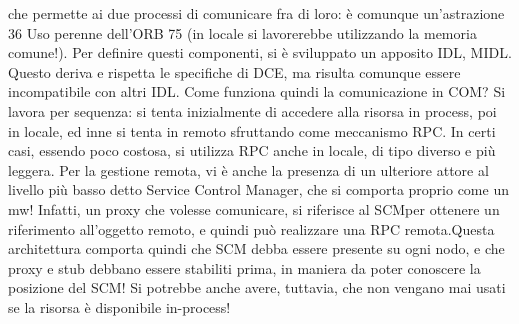 che permette ai due processi di comunicare fra di loro: è comunque un'astrazione
36 Uso
perenne dell'ORB
75
(in locale si lavorerebbe utilizzando la memoria comune!). Per definire questi
componenti, si è sviluppato un apposito IDL, MIDL. Questo deriva e rispetta
le specifiche di DCE, ma risulta comunque essere incompatibile con altri IDL.
Come funziona quindi la comunicazione in COM? Si lavora per sequenza: si
tenta inizialmente di accedere alla risorsa in process, poi in locale, ed inne si
tenta in remoto sfruttando come meccanismo RPC. In certi casi, essendo poco
costosa, si utilizza RPC anche in locale, di tipo diverso e più leggera.
Per la gestione remota, vi è anche la presenza di un ulteriore attore al livello
più basso detto Service Control Manager, che si comporta proprio come un mw!
Infatti, un proxy che volesse comunicare, si riferisce al SCMper ottenere un
riferimento all'oggetto remoto, e quindi può realizzare una RPC remota.Questa
architettura comporta quindi che SCM debba essere presente su ogni nodo, e
che proxy e stub debbano essere stabiliti prima, in maniera da poter conoscere
la posizione del SCM! Si potrebbe anche avere, tuttavia, che non vengano mai
usati se la risorsa è disponibile in-process!
